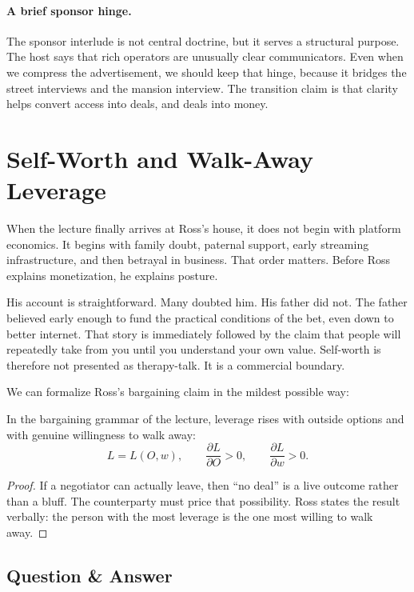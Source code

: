 \paragraph{A brief sponsor hinge.} The sponsor interlude is not central doctrine, but it serves a structural purpose. The host says that rich operators are unusually clear communicators. Even when we compress the advertisement, we should keep that hinge, because it bridges the street interviews and the mansion interview. The transition claim is that clarity helps convert access into deals, and deals into money.

\section{Self-Worth and Walk-Away Leverage}

When the lecture finally arrives at Ross's house, it does not begin with platform economics. It begins with family doubt, paternal support, early streaming infrastructure, and then betrayal in business. That order matters. Before Ross explains monetization, he explains posture.

His account is straightforward. Many doubted him. His father did not. The father believed early enough to fund the practical conditions of the bet, even down to better internet. That story is immediately followed by the claim that people will repeatedly take from you until you understand your own value. Self-worth is therefore not presented as therapy-talk. It is a commercial boundary.

We can formalize Ross's bargaining claim in the mildest possible way:
\begin{proposition}
In the bargaining grammar of the lecture, leverage rises with outside options and with genuine willingness to walk away:
\begin{equation}
L = L(O,w),\qquad \frac{\partial L}{\partial O}>0,\qquad \frac{\partial L}{\partial w}>0.
\end{equation}
\end{proposition}

\begin{proof}
If a negotiator can actually leave, then ``no deal'' is a live outcome rather than a bluff. The counterparty must price that possibility. Ross states the result verbally: the person with the most leverage is the one most willing to walk away.
\end{proof}

\subsection{Question \& Answer}

